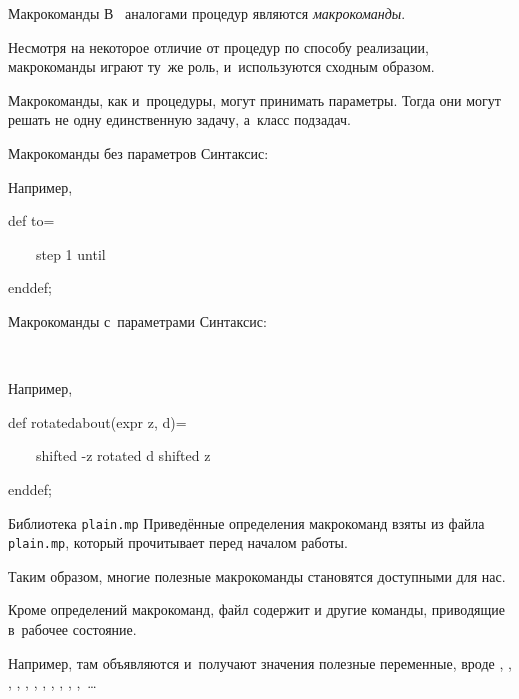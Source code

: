 
\begin{frame}{Макрокоманды}
В~ аналогами процедур являются \emph{макрокоманды}.

Несмотря на некоторое отличие от процедур по способу реализации, макрокоманды
играют ту~же роль, и~используются сходным образом.

Макрокоманды, как и~процедуры, могут принимать параметры. Тогда они могут
решать не одну единственную задачу, а~класс подзадач.
\end{frame}


\begin{frame}{Макрокоманды без параметров}
Синтаксис:
\begin{center}
\LARGE
{}\literal{=}
\end{center}

Например,
\begin{programlisting}
\Large
def \alert{to}=\par
~~~~\alert{step 1 until}\par
enddef;
\end{programlisting}
\end{frame}


\begin{frame}{Макрокоманды с~параметрами}
Синтаксис:
\begin{center}
\LARGE
{}\literal{)=}\\
 
\end{center}

Например,
\begin{programlisting}
\Large
def \alert{rotatedabout}(expr \alert{z, d})=\par
~~~~\alert{shifted -z rotated d shifted z}\par
enddef;
\end{programlisting}
\end{frame}


\begin{frame}{Библиотека \nolinkurl{plain.mp}}
Приведённые определения макрокоманд взяты из файла \nolinkurl{plain.mp}, который
 прочитывает перед началом работы.

Таким образом, многие полезные макрокоманды становятся доступными для нас.

Кроме определений макрокоманд, файл содержит и другие команды, приводящие
 в~рабочее состояние.

Например, там объявляются и~получают значения полезные переменные, вроде
, , , , ,
, , , ,
, ,~…
\end{frame}

